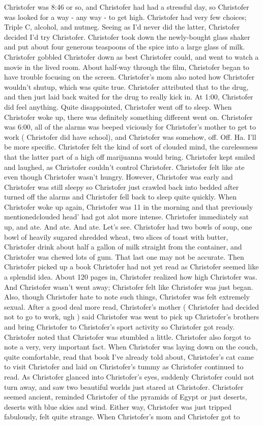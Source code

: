 \documentclass[12pt]{book}
\begin{document}
Christofer was 8:46 or so, and Christofer had had a stressful day, so Christofer was looked for a way - any way - to get high. Christofer had very few choices; Triple C, alcohol, and nutmeg. Seeing as I'd never did the latter, Christofer decided I'd try Christofer. Christofer took down the newly-bought glass shaker and put about four generous teaspoons of the spice into a large glass of milk. Christofer gobbled Christofer down as best Christofer could, and went to watch a movie in the lived room. About half-way through the film, Christofer began to have trouble focusing on the screen. Christofer's mom also noted how Christofer wouldn't shutup, which was quite true. Christofer attributed that to the drug, and then just laid back waited for the drug to really kick in. At 1:00, Christofer did feel anything. Quite disappointed, Christofer went off to sleep. When Christofer woke up, there was definitely something different went on. Christofer was 6:00, all of the alarms was beeped viciously for Christofer's mother to get to work ( Christofer did have school), and Christofer was somehow, off. Off. Ha. I'll be more specific. Christofer felt the kind of sort of clouded mind, the carelessness that the latter part of a high off marijuanna would bring. Christofer kept smiled and laughed, as Christofer couldn't control Christofer. Christofer felt like ate even though Christofer wasn't hungry. However, Christofer was early and Christofer was still sleepy so Christofer just crawled back into bedded after turned off the alarms and Christofer fell back to sleep quite quickly. When Christofer woke up again, Christofer was 11 in the morning and that previously mentionedclouded head' had got alot more intense. Christofer immediately sat up, and ate. And ate. And ate. Let's see. Christofer had two bowls of soup, one bowl of heavily sugared shredded wheat, two slices of toast with butter, Christofer drink about half a gallon of milk straight from the container, and Christofer was chewed lots of gum. That last one may not be accurate. Then Christofer picked up a book Christofer had not yet read as Christofer seemed like a splendid idea. About 120 pages in, Christofer realized how high Christofer was. And Christofer wasn't went away; Christofer felt like Christofer was just began. Also, though Christofer hate to note such things, Christofer was felt extremely sexual. After a good deal more read, Christofer's mother ( Christofer had decided not to go to work, ugh ) said Christofer was went to pick up Christofer's brothers and bring Christofer to Christofer's sport activity so Christofer got ready. Christofer noted that Christofer was stumbled a little. Christofer also forgot to note a very, very important fact. When Christofer was laying down on the couch, quite comfortable, read that book I've already told about, Christofer's cat came to visit Christofer and laid on Christofer's tummy as Christofer continued to read. As Christofer glanced into Christofer's eyes, suddenly Christofer could not turn away, and saw two beautiful worlds just stared at Christofer. Christofer seemed ancient, reminded Christofer of the pyramids of Egypt or just deserts, deserts with blue skies and wind. Either way, Christofer was just tripped fabulously, felt quite strange. When Christofer's mom and Christofer got to 
\end{document}
